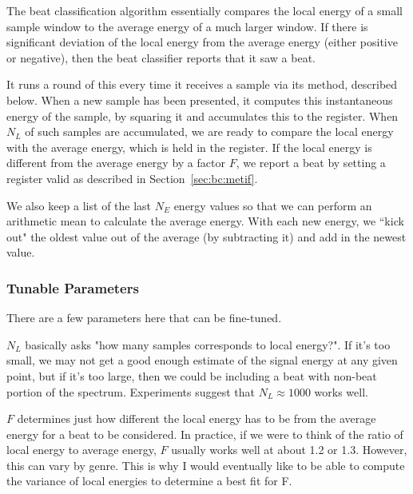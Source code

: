 \documentclass[letterpaper]{article}
\begin{document}
        The beat classification algorithm essentially compares the local energy of
        a small sample window to the average energy of a much larger window.  If
        there is significant deviation of the local energy from the average energy
        (either positive or negative), then the beat classifier reports that it saw
        a beat.

        It runs a round of this every time it receives a sample via its
         method, described below.  When a new sample has been
        presented, it computes this instantaneous energy of the sample, by squaring
        it and accumulates this to the  register.  When $N_L$ of
        such samples are accumulated, we are ready to compare the local energy with
        the average energy, which is held in the  register.  If
        the local energy is different from the average energy by a factor $F$, we
        report a beat by setting a register valid as described in
        Section~\ref{sec:bc:metif}.

        We also keep a list of the last $N_E$ energy values so that we can
        perform an arithmetic mean to calculate the average energy.  With each
        new energy, we ``kick out" the oldest value out of the average (by
        subtracting it) and add in the newest value.

        
        \subsubsection{Tunable Parameters}

        There are a few parameters here that can be fine-tuned.

        $N_L$ basically asks "how many samples corresponds to local energy?".  If
        it's too small, we may not get a good enough estimate of the signal energy
        at any given point, but if it's too large, then we could be including a
        beat with non-beat portion of the spectrum.  Experiments suggest that $N_L
        \approx 1000$ works well.

        $F$ determines just how different the local energy has to be from the
        average energy for a beat to be considered.  In practice, if we were to
        think of the ratio of local energy to average energy, $F$ usually works
        well at about 1.2 or 1.3.  However, this can vary by genre.  This is why I
        would eventually like to be able to compute the variance of local energies
        to determine a best fit for F.
\end{document}
